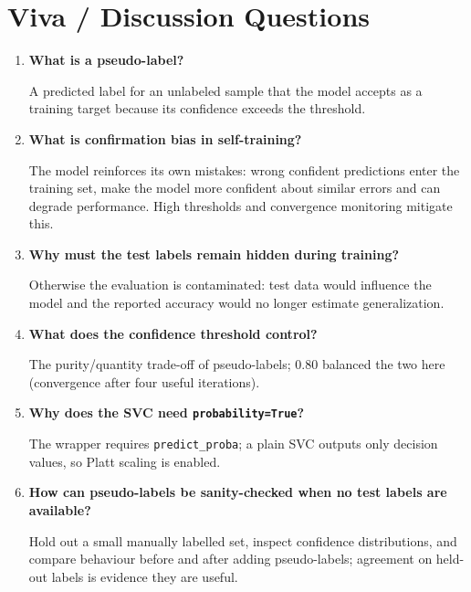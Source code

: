 \section{Viva / Discussion Questions}
\begin{enumerate}
  \item \textbf{What is a pseudo-label?}\par\nobreak A predicted label for an unlabeled sample that the model
  accepts as a training target because its confidence exceeds the threshold.
  \item \textbf{What is confirmation bias in self-training?}\par\nobreak The model reinforces its own mistakes:
  wrong confident predictions enter the training set, make the model more confident about
  similar errors and can degrade performance. High thresholds and convergence monitoring
  mitigate this.
  \item \textbf{Why must the test labels remain hidden during training?}\par\nobreak Otherwise the evaluation is
  contaminated: test data would influence the model and the reported accuracy would no longer
  estimate generalization.
  \item \textbf{What does the confidence threshold control?}\par\nobreak The purity/quantity trade-off of
  pseudo-labels; 0.80 balanced the two here (convergence after four useful iterations).
  \item \textbf{Why does the SVC need \texttt{probability=True}?}\par\nobreak The wrapper requires
  \texttt{predict\_proba}; a plain SVC outputs only decision values, so Platt scaling is
  enabled.
\item \textbf{How can pseudo-labels be sanity-checked when no test labels are available?}\par\nobreak Hold out a small manually labelled set, inspect confidence distributions, and compare behaviour before and after adding pseudo-labels; agreement on held-out labels is evidence they are useful.
\end{enumerate}

